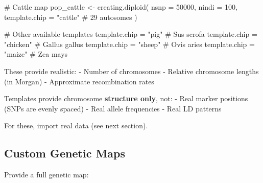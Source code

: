 \documentclass[
  letterpaper,
]{book}
\newenvironment{Shaded}{\begin{snugshade}}{\end{snugshade}}
\newcommand{\AttributeTok}[1]{\textcolor[rgb]{0.40,0.45,0.13}{#1}}
\newcommand{\CommentTok}[1]{\textcolor[rgb]{0.37,0.37,0.37}{#1}}
\newcommand{\DecValTok}[1]{\textcolor[rgb]{0.68,0.00,0.00}{#1}}
\newcommand{\FunctionTok}[1]{\textcolor[rgb]{0.28,0.35,0.67}{#1}}
\newcommand{\NormalTok}[1]{\textcolor[rgb]{0.00,0.23,0.31}{#1}}
\newcommand{\OtherTok}[1]{\textcolor[rgb]{0.00,0.23,0.31}{#1}}
\newcommand{\StringTok}[1]{\textcolor[rgb]{0.13,0.47,0.30}{#1}}
\begin{document}
\begin{Shaded}
\begin{Highlighting}[]
\CommentTok{\# Cattle map}
\NormalTok{pop\_cattle }\OtherTok{\textless{}{-}} \FunctionTok{creating.diploid}\NormalTok{(}
  \AttributeTok{nsnp =} \DecValTok{50000}\NormalTok{,}
  \AttributeTok{nindi =} \DecValTok{100}\NormalTok{,}
  \AttributeTok{template.chip =} \StringTok{"cattle"}   \CommentTok{\# 29 autosomes}
\NormalTok{)}

\CommentTok{\# Other available templates}
\NormalTok{template.chip }\OtherTok{=} \StringTok{"pig"}       \CommentTok{\# Sus scrofa}
\NormalTok{template.chip }\OtherTok{=} \StringTok{"chicken"}   \CommentTok{\# Gallus gallus}
\NormalTok{template.chip }\OtherTok{=} \StringTok{"sheep"}     \CommentTok{\# Ovis aries}
\NormalTok{template.chip }\OtherTok{=} \StringTok{"maize"}     \CommentTok{\# Zea mays}
\end{Highlighting}
\end{Shaded}

These provide realistic: - Number of chromosomes - Relative chromosome
lengths (in Morgan) - Approximate recombination rates

\begin{tcolorbox}[enhanced jigsaw, breakable, coltitle=black, opacitybacktitle=0.6, left=2mm, colframe=quarto-callout-note-color-frame, toprule=.15mm, colback=white, bottomtitle=1mm, colbacktitle=quarto-callout-note-color!10!white, opacityback=0, leftrule=.75mm, toptitle=1mm, rightrule=.15mm, arc=.35mm, titlerule=0mm, title=\textcolor{quarto-callout-note-color}{\faInfo}\hspace{0.5em}{What Templates DON'T Include}, bottomrule=.15mm]

Templates provide chromosome \textbf{structure only}, not: - Real marker
positions (SNPs are evenly spaced) - Real allele frequencies - Real LD
patterns

For these, import real data (see next section).

\end{tcolorbox}

\subsection{Custom Genetic Maps}\label{custom-genetic-maps}

Provide a full genetic map:
\end{document}
